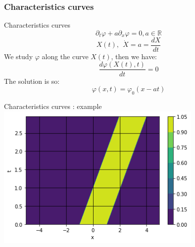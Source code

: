 \documentclass{beamer}
\begin{document}
            \subsubsection{Characteristics curves}
                \begin{frame}{Characteristics curves}
                    \begin{equation*}
                        \partial_t\varphi+ a\partial_x\varphi = 0, a \in \mathds{R}
                    \end{equation*}
                    \pause
                    \begin{equation*}
                        X(t),~~ \dot X = a=\frac{dX}{dt}
                    \end{equation*}
                    \pause
                    We study $\varphi$ along the curve $X(t)$, then we have:
                    \begin{equation*}
                        \frac{d\varphi(X(t),t)}{dt}=0
                    \end{equation*}
                    \pause
                    The solution is so:
                    \begin{equation*}
                        \varphi(x,t) = \varphi_0(x-at)
                    \end{equation*}
                \end{frame}
                
                \begin{frame}{Characteristics curves : example}
                    \includegraphics[width=10cm]{transport.png}
                \end{frame}
                
    
\end{document}
